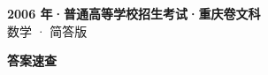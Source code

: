 \documentclass[zihao=-4, a4paper]{ctexart}
\begin{document}
\begin{center}
  {\Large\bfseries 2006 年·普通高等学校招生考试·重庆卷文科}\\[4pt]
  {\large 数学 · 简答版}
\end{center}
\medskip
{}

\clearpage
{}
\begin{center}{\Large\bfseries 答案速查}\end{center}
\medskip

\end{document}
